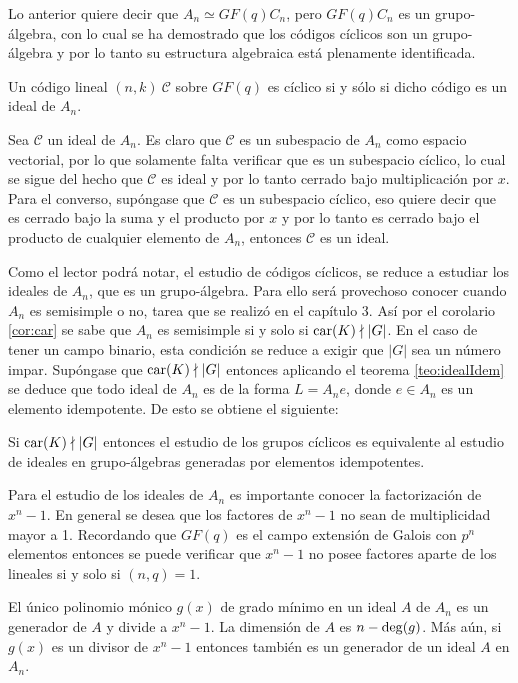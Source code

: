 Lo anterior quiere decir que $A_n \simeq GF(q)C_n$, pero $GF(q)C_n$ es un grupo-álgebra, con lo cual se ha demostrado que los códigos cíclicos son un grupo-álgebra y por lo tanto su estructura algebraica está plenamente identificada. 
\begin{teorema}
Un código lineal $(n,k) \ \mathcal{C}$ sobre $GF(q)$ es cíclico si y sólo si dicho código es un ideal de $A_n$.
\end{teorema}
\begin{proof*}
Sea $\mathcal{C}$ un ideal de $A_n$. Es claro que $\mathcal{C}$ es un subespacio de $A_n$ como espacio vectorial, por lo que solamente falta verificar que es un subespacio cíclico, lo cual se sigue del hecho que $\mathcal{C}$ es ideal y por lo tanto cerrado bajo multiplicación por $x$.
Para el converso, supóngase que $\mathcal{C}$ es un subespacio cíclico, eso quiere decir que es cerrado bajo la suma y el producto por $x$ y por lo tanto es cerrado bajo el producto de cualquier elemento de $A_n$, entonces $\mathcal{C}$ es un ideal.
\end{proof*}
Como el lector podrá notar, el estudio de códigos cíclicos, se reduce a estudiar los ideales de $A_n$, que es un grupo-álgebra. Para ello será provechoso conocer cuando $A_n$ es semisimple o no, tarea que se realizó en el capítulo 3. 
Así por el corolario \ref{cor:car} se sabe que $A_n$ es semisimple si y solo si $\operatorname{car}(K) \nmid |G|$. En el caso de tener un campo binario, esta condición se reduce a exigir que $|G|$ sea un número impar. Supóngase que $\operatorname{car}(K) \nmid |G|$ entonces aplicando el teorema \ref{teo:idealIdem} se deduce que todo ideal de $A_n$ es de la forma $L=A_ne$, donde $e \in A_n$ es un elemento idempotente. De esto se obtiene el siguiente:
\begin{teorema}
Si $\operatorname{car}(K)\nmid|G|$ entonces el estudio de los grupos cíclicos es equivalente al estudio de ideales en grupo-álgebras generadas por elementos idempotentes.
\end{teorema}
Para el estudio de los ideales de $A_n$ es importante conocer la factorización de $x^n-1$. En general se desea que los factores de $x^n-1$ no sean de multiplicidad mayor a 1. Recordando que $GF(q)$ es el campo extensión de Galois con $p^n$ elementos entonces se puede verificar que $x^n-1$ no posee factores aparte de los lineales si y solo si $(n,q)=1$.
\begin{teorema}
El único polinomio mónico $g(x)$ de grado mínimo en un ideal $A$ de $A_n$ es un generador de $A$ y divide a $x^n-1$. La dimensión de $A$ es $n -\operatorname{deg}(g)$. Más aún, si $g(x)$ es un divisor de $x^n-1$ entonces también es un generador de un ideal $A$ en $A_n$.
\end{teorema}
